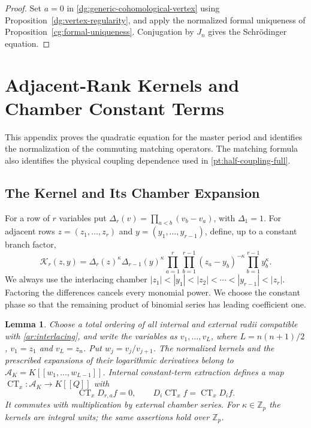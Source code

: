 \documentclass[11pt]{amsart}
\newtheorem{lemma}[theorem]{Lemma}
\theoremstyle{definition}
\theoremstyle{remark}
\numberwithin{equation}{section}
\newcommand{\Z}{\mathbb Z}
\DeclareMathOperator{\CT}{CT}
\begin{document}
\begin{proof}
Set $a=0$ in \eqref{dg:generic-cohomological-vertex} using
Proposition~\ref{dg:vertex-regularity}, and apply the normalized
formal uniqueness of Proposition~\ref{cg:formal-uniqueness}.
Conjugation by $J_n$ gives the Schr\"odinger equation.
\end{proof}


\section{Adjacent-Rank Kernels and Chamber Constant Terms}
\label{tc:section}
\label{tc:kernel-appendix}
This appendix proves the quadratic equation for the master
period and identifies the normalization of the commuting
matching operators. The matching formula also identifies the physical
coupling dependence used in \eqref{pt:half-coupling-full}.

\subsection{The Kernel and Its Chamber Expansion}
For a row of $r$ variables put
$\Delta_r(v)=\prod_{a<b}(v_b-v_a)$, with $\Delta_1=1$.
For adjacent rows $z=(z_1,\ldots,z_r)$ and
$y=(y_1,\ldots,y_{r-1})$, define, up to a constant branch factor,
\begin{equation}\label{tc:kernel-definition}
 \mathscr K_r(z,y)
 =\Delta_r(z)^\kappa\Delta_{r-1}(y)^\kappa
   \prod_{a=1}^r\prod_{b=1}^{r-1}(z_a-y_b)^{-\kappa}
   \prod_{b=1}^{r-1}y_b^\kappa.
\end{equation}
We always use the interlacing chamber
$|z_1|<|y_1|<|z_2|<\cdots<|y_{r-1}|<|z_r|$.
Factoring the differences cancels every monomial power.
We choose the constant phase so that the remaining product of
binomial series has leading coefficient one.

\begin{lemma}\label{tc:chamber-ring}
Choose a total ordering of all internal and external radii
compatible with \eqref{ar:interlacing}, and write the variables
as $v_1,\ldots,v_L$, where $L=n(n+1)/2$, $v_1=z_1$ and
$v_L=z_n$. Put $w_j=v_j/v_{j+1}$.
The normalized kernels and the prescribed expansions of their
logarithmic derivatives belong to
$\mathscr A_K=K[[w_1,\ldots,w_{L-1}]]$.
Internal constant-term extraction defines a map
$\CT_x:\mathscr A_K\to K[[Q]]$ with
\[
 \CT_x D_{r,a}f=0,\qquad
 D_i\CT_x f=\CT_xD_if.
\]
It commutes with multiplication by external chamber series.
For $\kappa\in\Z_p$ the kernels are integral units; the same
assertions hold over $\Z_p$.
\end{lemma}
\end{document}
